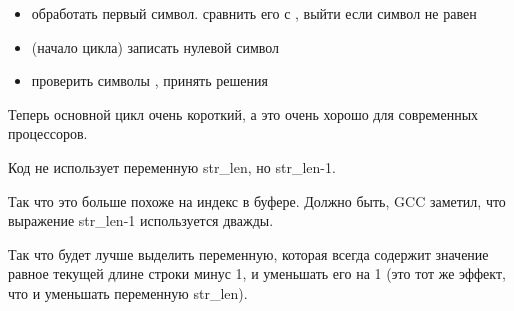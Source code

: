 \begin{itemize}
\item обработать первый символ. сравнить его с \CRLF{}, выйти если символ не равен \CRLF{}

\item (начало цикла) записать нулевой символ

\item проверить символы \CRLF{}, принять решения

\end{itemize}

Теперь основной цикл очень короткий, а это очень хорошо для современных процессоров.

Код не использует переменную str\_len, но str\_len-1.

Так что это больше похоже на индекс в буфере.
Должно быть, GCC заметил, что выражение str\_len-1 используется дважды.

Так что будет лучше выделить переменную, которая всегда содержит значение равное 
текущей длине строки минус 1, и уменьшать его на 1 (это тот же эффект, что и уменьшать
переменную str\_len).

